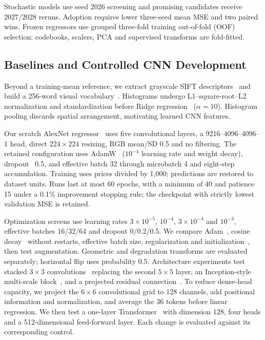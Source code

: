 \documentclass[conference,a4paper]{IEEEtran}
\begin{document}
Stochastic models use seed 2026 screening and promising candidates receive 2027/2028 reruns. Adoption requires lower three-seed mean MSE and two paired wins. Frozen regressors use grouped three-fold training out-of-fold (OOF) selection; codebooks, scalers, PCA and supervised transforms are fold-fitted.

\subsection{Baselines and Controlled CNN Development}
Beyond a training-mean reference, we extract grayscale SIFT descriptors~\cite{sift1999,sift} and build a 256-word visual vocabulary~\cite{bovw}. Histograms undergo L1--square-root--L2 normalization and standardization before Ridge regression~\cite{ridge} ($\alpha=10$). Histogram pooling discards spatial arrangement, motivating learned CNN features.

Our scratch AlexNet regressor~\cite{alexnet} uses five convolutional layers, a 9216--4096--4096--1 head, direct $224\times224$ resizing, RGB mean/SD 0.5 and no filtering. The retained configuration uses AdamW~\cite{adamw} ($10^{-4}$ learning rate and weight decay), dropout~\cite{dropout2012,dropout} 0.5, and effective batch 32 through microbatch 4 and eight-step accumulation. Training uses prices divided by 1,000; predictions are restored to dataset units. Runs last at most 60 epochs, with a minimum of 40 and patience 15 under a 0.1\% improvement stopping rule; the checkpoint with strictly lowest validation MSE is retained.

Optimization screens use learning rates $3\times10^{-5}$, $10^{-4}$, $3\times10^{-4}$ and $10^{-3}$, effective batches 16/32/64 and dropout 0/0.2/0.5. We compare Adam~\cite{adam}, cosine decay~\cite{sgdr} without restarts, effective batch size, regularization and initialization~\cite{xavier,heinit}, then test augmentation. Geometric and degradation transforms are evaluated separately; horizontal flip uses probability 0.5. Architecture experiments test stacked $3\times3$ convolutions~\cite{vgg} replacing the second $5\times5$ layer, an Inception-style multi-scale block~\cite{inception}, and a projected residual connection~\cite{resnet}. To reduce dense-head capacity, we project the $6\times6$ convolutional grid to 128 channels, add positional information and normalization, and average the 36 tokens before linear regression. We then test a one-layer Transformer~\cite{transformer} with dimension 128, four heads and a 512-dimensional feed-forward layer. Each change is evaluated against its corresponding control.
\end{document}

